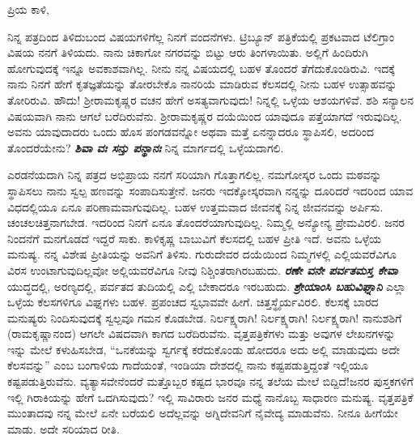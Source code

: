 \noindent
ಪ್ರಿಯ ಕಾಳಿ,

ನಿನ್ನ ಪತ್ರದಿಂದ ತಿಳಿದುಬಂದ ವಿಷಯಗಳಿಗೆಲ್ಲ ನಿನಗೆ ವಂದನೆಗಳು. ಟ್ರಿಬ್ಯೂನ್ ಪತ್ರಿಕೆಯಲ್ಲಿ ಪ್ರಕಟವಾದ ಟೆಲಿಗ್ರಾಂ ವಿಷಯ ನನಗೆ ತಿಳಿಯದು. ನಾನು ಚಿಕಾಗೋ ನಗರವನ್ನು ಬಿಟ್ಟು ಆರು ತಿಂಗಳಾಯಿತು. ಅಲ್ಲಿಗೆ ಹಿಂದಿರುಗಿ ಹೋಗುವುದಕ್ಕೆ ಇನ್ನೂ ಅವಕಾಶವಾಗಿಲ್ಲ. ನೀನು ನನ್ನ ವಿಷಯದಲ್ಲಿ ಬಹಳ ತೊಂದರೆ ತೆಗೆದುಕೊಂಡಿರುವಿ. ಇದಕ್ಕೆ ನಾನು ನಿನಗೆ ಹೇಗೆ ಕೃತಜ್ಞತೆಯನ್ನು ತೋರಬೇಕೊ ನಾನರಿಯೆ ಮಾಡಿರುವ ಕೆಲಸದಲ್ಲಿ ನೀನು ಬಹಳ ಉತ್ಸಾಹವನ್ನು ತೋರಿರುವಿ. ಹೌದು! ಶ‍್ರೀರಾಮಕೃಷ್ಣರ ವಚನ ಹೇಗೆ ಅಸತ್ಯವಾಗುವುದು! ನಿನ್ನಲ್ಲಿ ಒಳ್ಳೆಯ ಆಶಯಗಳಿವೆ. ಶಶಿ ಸನ್ಯಾಲನ ವಿಷಯವಾಗಿ ನಾನು ಆಗಲೆ ಬರೆದಿರುವೆನು. ಶ‍್ರೀರಾಮಕೃಷ್ಣರ ದಯೆಯಿಂದ ಯಾವುದೂ ಪತ್ತೆಯಾಗದೆ ಇರುವುದಿಲ್ಲ. ಅವನು ಯಾವುದಾದರು ಒಂದು ಹೊಸ ಪಂಗಡವನ್ನೋ ಅಥವಾ ಮತ್ತೆ ಏನನ್ನಾದರೂ ಸ್ಥಾಪಿಸಲಿ, ಅದರಿಂದ ತೊಂದರೆಯೇನು? \textbf{\textit{ಶಿವಾ ವಃ ಸನ್ತು ಪನ್ಥಾನಃ}} ನಿನ್ನ ಮಾರ್ಗದಲ್ಲಿ ಒಳ್ಳೆಯದಾಗಲಿ.

\vspace{0.1cm}

ಎರಡನೆಯದಾಗಿ ನಿನ್ನ ಪತ್ರದ ಅಭಿಪ್ರಾಯ ನನಗೆ ಸರಿಯಾಗಿ ಗೊತ್ತಾಗಲಿಲ್ಲ. ನಮಗೋಸ್ಕರ ಒಂದು ಮಠವನ್ನು ಸ್ಥಾಪಿಸಲು ನಾನು ಸ್ವಲ್ಪ ಹಣವನ್ನು ಸಂಪಾದಿಸುತ್ತೇನೆ. ಜನರು ಇದಕ್ಕೋಸ್ಕರವಾಗಿ ನನ್ನನ್ನು ದೂರಿದರೆ ಇದರಿಂದ ಯಾವ ವಿಧದಲ್ಲಿಯೂ ಏನೂ ಪರಿಣಾಮವಾಗುವುದಿಲ್ಲ. ಬಹಳ ಉತ್ತಮವಾದ ಜೀವನಕ್ಕೆ ನಿನ್ನ ಜೀವನವನ್ನು ಅರ್ಪಿಸು. ಚಂಚಲಚಿತ್ತನಾಗಬೇಡ. ಇದರಿಂದ ನಿನಗೆ ಏನೂ ತೊಂದರೆಯಾಗುವುದಿಲ್ಲ. ನಿಮ್ಮಲ್ಲಿ ಅನ್ಯೋನ್ಯ ಪ್ರೇಮವಿರಲಿ. ಜನರ ನಿಂದನೆಗೆ ಮನಗೊಡದೆ ಇದ್ದರೆ ಸಾಕು. ಕಾಳಿಕೃಷ್ಣ ಬಾಬುವಿಗೆ ಕೆಲಸದಲ್ಲಿ ಬಹಳ ಪ್ರೀತಿ ಇದೆ. ಅವನು ಒಳ್ಳೆಯ ಮನುಷ್ಯ. ನನ್ನ ವಿಶೇಷ ಪ್ರೀತಿಯನ್ನು ಅವನಿಗೆ ತಿಳಿಸು. ಗುರುದೇವರ ದಯೆಯಿಂದ ನಿಮ್ಮಗಳಲ್ಲಿ ಎಲ್ಲಿಯವರೆವಿಗೂ ವಿರಸ ಉಂಟಾಗುವುದಿಲ್ಲವೋ ಅಲ್ಲಿಯವರೆವಿಗೂ ನೀವು ನಿಶ್ಚಿಂತರಾಗಿರಬಹುದು. \textbf{\textit{ರಣೇ ವನೇ ಪರ್ವತಮಸ್ತ ಕೇವಾ}} ಯುದ್ಧದಲ್ಲಿ, ಅರಣ್ಯದಲ್ಲಿ, ಪರ್ವತದ ತುದಿಯಲ್ಲಿ ಎಲ್ಲಿ ಬೇಕಾದರೂ ಇರಬಹುದು. \textbf{\textit{ಶ್ರೇಯಾಂಸಿ ಬಹುವಿಘ್ನಾನಿ\enginline{-}}} ಎಲ್ಲಾ ಒಳ್ಳೆಯ ಕೆಲಸಗಳಿಗೂ ವಿಘ್ನಗಳು ಬಹಳ. ಪ್ರಪಂಚದ ಸ್ವಭಾವವೇ ಹೀಗೆ. ಚಿತ್ತಸ್ಥೈರ್ಯವಿರಲಿ. ಕೆಲಸಕ್ಕೆ ಬಾರದ ಮನುಷ್ಯರು ನಿಂದಿಸುವುದಕ್ಕೆ ಸ್ವಲ್ಪವೂ ಗಮನ ಕೊಡಬೇಡ. ನಿರ್ಲಕ್ಷ್ಯರಾಗಿ! ನಿರ್ಲಕ್ಷ್ಯರಾಗಿ! ನಿರ್ಲಕ್ಷ್ಯರಾಗಿ! ನಾನು\enginline{-}ಶಶಿಗೆ (ರಾಮಕೃಷ್ಣಾನಂದ) ಆಗಲೇ ವಿಷದವಾಗಿ ಕಾಗದ ಬರೆದಿರುವೆನು. ವೃತ್ತಪತ್ರಿಕೆಗಳು ಮತ್ತು ಅವುಗಳ ಲೇಖನಗಳನ್ನು ಇನ್ನು ಮೇಲೆ ಕಳುಹಿಸಬೇಡ, ``ಒನಕೆಯನ್ನು ಸ್ವರ್ಗಕ್ಕೆ ಕರೆದುಕೊಂಡು ಹೋದರೂ ಅದು ಅಲ್ಲಿ ಮಾಡುವುದು ಅದೇ ಕೆಲಸವನ್ನು” ಎಂಬ ಬಂಗಾಳಿಯ ಗಾದೆಯಂತೆ, ಇಂಡಿಯಾ ದೇಶದಲ್ಲಿ ನಾನು ಕಷ್ಟಪಡುತ್ತಿದ್ದಂತೆ ಇಲ್ಲಿಯೂ ಕಷ್ಟಪಡುತ್ತಿರುವೆನು. ವ್ಯತ್ಯಾಸವೇನೆಂದರೆ ಮತ್ತೊಬ್ಬರ ಕಷ್ಟದ ಭಾರವೂ ನನ್ನ ತಲೆಯ ಮೇಲೆ ಬಿದ್ದಿದೆ!ಜನರ ಪುಸ್ತಕಗಳಿಗೆ ಇಲ್ಲಿ ಗಿರಾಕಿಯನ್ನು ಹೇಗೆ ಒದಗಿಸುವುದು? ಇಲ್ಲಿ ಸಾವಿರಾರು ಜನರ ಮಧ್ಯೆ ನಾನೊಬ್ಬ ಸಾಧಾರಣ ಮನುಷ್ಯ. ವೃತ್ತಪತ್ರಿಕೆ ಮುಂತಾದವು ನನ್ನ ಮೇಲೆ ಏನೇ ಬರೆಯಲಿ ಅದೆಲ್ಲವನ್ನು ಅಗ್ನಿದೇವನಿಗೆ ನೈವೇದ್ಯ ಮಾಡುವೆನು. ನೀನೂ ಹೀಗೆಯೇ ಮಾಡು. ಅದೇ ಸರಿಯಾದ ರೀತಿ.

\vspace{0.1cm}

